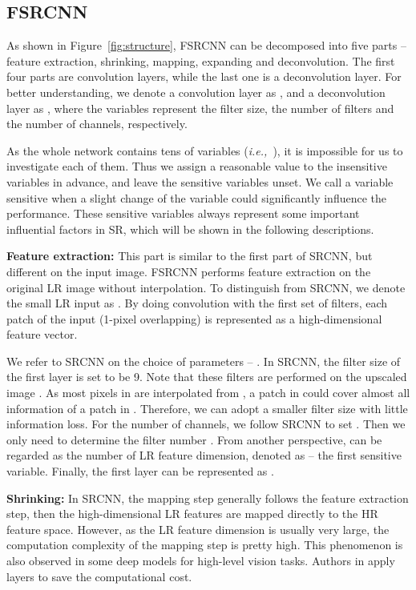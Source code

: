 \documentclass[runningheads]{llncs}
\newcommand{\ie}{\emph{i.e.,}}
\begin{document}
\subsection{FSRCNN}
As shown in Figure~\ref{fig:structure}, FSRCNN can be decomposed into five parts -- feature extraction, shrinking, mapping, expanding and deconvolution. The first four parts are convolution layers, while the last one is a deconvolution layer. For better understanding, we denote a convolution layer as , and a deconvolution layer as , where the variables  represent the filter size, the number of filters and the number of channels, respectively.

As the whole network contains tens of variables (\ie~), it is impossible for us to investigate each of them. Thus we assign a reasonable value to the insensitive variables in advance, and leave the sensitive variables unset. We call a variable sensitive when a slight change of the variable could significantly influence the performance. These sensitive variables always represent some important influential factors in SR, which will be shown in the following descriptions.

\noindent
\textbf{Feature extraction:} This part is similar to the first part of SRCNN, but different on the input image. FSRCNN performs feature extraction on the original LR image without interpolation. To distinguish from SRCNN, we denote the small LR input as . By doing convolution with the first set of filters, each patch of the input (1-pixel overlapping) is represented as a high-dimensional feature vector.

We refer to SRCNN on the choice of parameters -- . In SRCNN, the filter size of the first layer is set to be 9. Note that these filters are performed on the upscaled image . As most pixels in  are interpolated from , a  patch in  could cover almost all information of a  patch in . Therefore, we can adopt a smaller filter size  with little information loss. For the number of channels, we follow SRCNN to set . Then we only need to determine the filter number . From another perspective,  can be regarded as the number of LR feature dimension, denoted as  -- the first sensitive variable. Finally, the first layer can be represented as .

\noindent
\textbf{Shrinking:} In SRCNN, the mapping step generally follows the feature extraction step, then the high-dimensional LR features are mapped directly to the HR feature space. However, as the LR feature dimension  is usually very large, the computation complexity of the mapping step is pretty high. This phenomenon is also observed in some deep models for high-level vision tasks.
Authors in \cite{Lin2014} apply  layers to save the computational cost.
\end{document}
